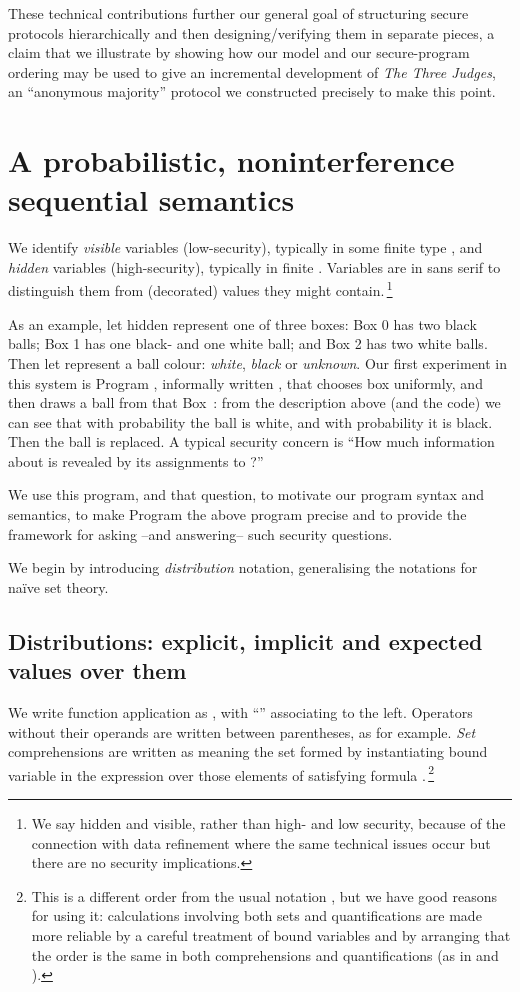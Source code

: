 \documentclass[runningheads]{llncs}
\begin{document}
These technical contributions further our general goal of structuring secure protocols hierarchically and then designing/verifying them in separate pieces, a claim that we illustrate by showing how our model and our secure-program ordering may be used to give an incremental development of \emph{The Three Judges}, an ``anonymous majority'' protocol we constructed precisely to make this point.

\section{A probabilistic, noninterference sequential semantics}\label{s1121}
We identify \emph{visible} variables (low-security), typically  in  some finite type , and \emph{hidden} variables (high-security), typically  in finite . Variables are in \textsf{sans serif} to distinguish them from (decorated) values  they might contain.\,\footnote{We say hidden and visible, rather than high- and low security, because of the connection with data refinement where the same technical issues occur but there are no security implications.}

As an example, let hidden  represent one of three boxes: Box 0 has two black balls; Box 1 has one black- and one white ball; and Box 2 has two white balls. Then let  represent a ball colour: \emph{white}, \emph{black} or \emph{unknown}. Our first experiment in this system is Program , informally written , that chooses box  uniformly, and then draws a ball  from that Box~: from the description above (and the code) we can see that with probability   the ball is white, and with probability  it is black. Then the ball is replaced. A typical security concern is ``How much information about  is revealed by its assignments to ?''

We use this program, and that question, to motivate our program syntax and semantics, to make Program  the above program precise and to provide the framework for asking --and answering-- such security questions.

We begin by introducing \emph{distribution} notation, generalising the notations for na{\"i}ve set theory.


\subsection{Distributions: explicit, implicit and expected values over them}\label{s1729}

We write function application as , with ``'' associating to the left. Operators without their operands are written between parentheses, as  for example. 
\emph{Set} comprehensions are written as  meaning the set formed by instantiating bound variable  in the expression  over those elements of  satisfying formula .\,\footnote{This is a different order from the usual notation , but we have good reasons for using it: calculations involving both sets and quantifications are made more reliable by a careful treatment of bound variables and by arranging that the order  is the same in both comprehensions and quantifications (as in  and ).}
\end{document}
